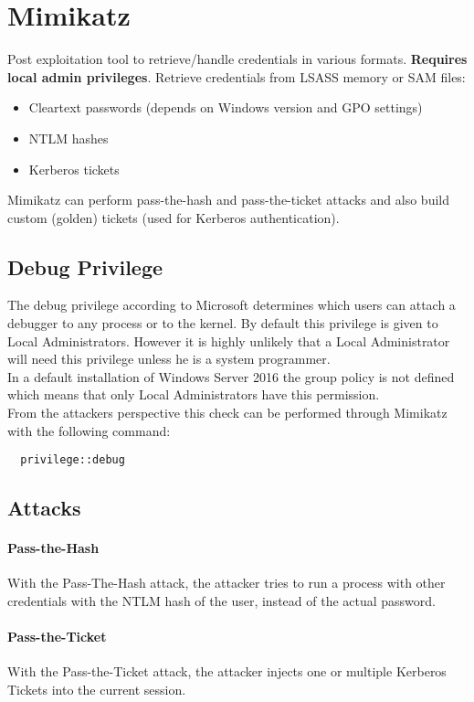 \section{Mimikatz}
Post exploitation tool to retrieve/handle credentials in various formats. \textbf{Requires local admin privileges}. Retrieve credentials from LSASS memory or SAM files:
\begin{itemize}
  \item Cleartext passwords (depends on Windows version and GPO settings)
  \item NTLM hashes
  \item Kerberos tickets
\end{itemize}
Mimikatz can perform pass-the-hash and pass-the-ticket attacks and also build custom (golden) tickets (used for Kerberos authentication).\\

\subsection{Debug Privilege}
The debug privilege according to Microsoft determines which users can attach a debugger to any process or to the kernel. By default this privilege is given to Local Administrators. However it is highly unlikely that a Local Administrator will need this privilege unless he is a system programmer.\\

In a default installation of Windows Server 2016 the group policy is not defined which means that only Local Administrators have this permission.\\

From the attackers perspective this check can be performed through Mimikatz with the following command:
\begin{lstlisting}
  privilege::debug
\end{lstlisting}

\subsection{Attacks}
\paragraph{Pass-the-Hash}
With the Pass-The-Hash attack, the attacker tries to run a process with other credentials with the NTLM hash of the user, instead of the actual password.

\paragraph{Pass-the-Ticket}
With the Pass-the-Ticket attack, the attacker injects one or multiple Kerberos Tickets into the current session.

